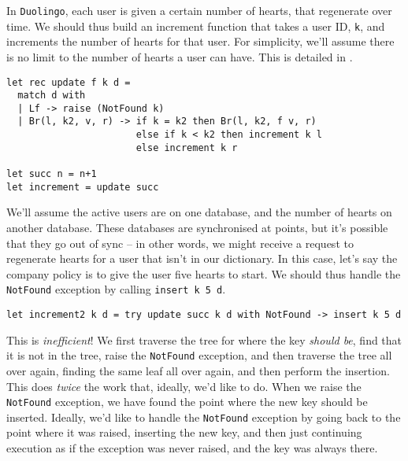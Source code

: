 In \texttt{Duolingo}, each user is given a certain number of hearts, that regenerate over time. We should thus build an increment function that takes a user ID, \texttt{k}, and increments the number of hearts for that user. For simplicity, we'll assume there is no limit to the number of hearts a user can have. This is detailed in .

\begin{code}
\label{code:ocaml-inefficient-update}
\begin{verbatim}
let rec update f k d =
  match d with
  | Lf -> raise (NotFound k)
  | Br(l, k2, v, r) -> if k = k2 then Br(l, k2, f v, r)
                       else if k < k2 then increment k l
                       else increment k r
                       
let succ n = n+1                   
let increment = update succ
\end{verbatim}
\end{code}

We'll assume the active users are on one database, and the number of hearts on another database. These databases are synchronised at points, but it's possible that they go out of sync -- in other words, we might receive a request to regenerate hearts for a user that isn't in our dictionary. In this case, let's say the company policy is to give the user five hearts to start. We should thus handle the \texttt{NotFound} exception by calling \texttt{insert k 5 d}. 

\begin{code}
\label{code:ocaml-inefficient-update}
\begin{verbatim}   
let increment2 k d = try update succ k d with NotFound -> insert k 5 d
\end{verbatim}
\end{code}

This is \textit{inefficient}! We first traverse the tree for where the key \textit{should be}, find that it is not in the tree, raise the \texttt{NotFound} exception, and then traverse the tree all over again, finding the same leaf all over again, and then perform the insertion. This does \textit{twice} the work that, ideally, we'd like to do. When we raise the \texttt{NotFound} exception, we have found the point where the new key should be inserted. Ideally, we'd like to handle the \texttt{NotFound} exception by going back to the point where it was raised, inserting the new key, and then just continuing execution as if the exception was never raised, and the key was always there.

